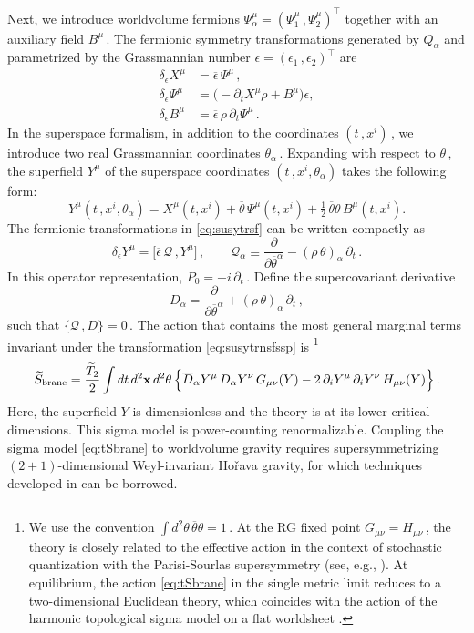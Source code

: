 \documentclass[11pt]{article}
\newcommand{\be}{\begin{equation}}
\newcommand{\ee}{\end{equation}}
\newcommand{\CQ}{\mathcal{Q}}
\newcommand{\p}{\partial}
\renewcommand{\tilde}[1]{\widetilde{#1}}
\begin{document}
Next, we introduce worldvolume fermions $\Psi^\mu_\alpha = (\Psi^\mu_1\,, \Psi^\mu_2)^\intercal$ together with an auxiliary field $B^{\mu}$\,. The fermionic symmetry transformations generated by $Q_\alpha$ and parametrized by the Grassmannian number $\epsilon = (\epsilon_1\,, \epsilon_2)^\intercal$ are
%
\begin{subequations} \label{eq:susytrsf}
\begin{align}
	\delta_\epsilon X^\mu & = \overline{\epsilon} \, \Psi^\mu\,, \\[2pt]
	\delta_\epsilon \Psi^\mu & = \bigl( - \p_t X^\mu \rho + B^{\mu} \bigr) \epsilon, \\[2pt]
	\delta_\epsilon B^{\mu} & = \overline{\epsilon} \, \rho \, \p_t \Psi^\mu\,.
\end{align}
\end{subequations}
%
In the superspace formalism, in addition to the coordinates $(t\,, x^i)$\,, we introduce two real Grassmannian coordinates $\theta_\alpha$\,.  Expanding with respect to $\theta$\,, the superfield $Y^\mu$ of the superspace coordinates $(t\,, x^i, \theta_\alpha)$ takes the following form: 
%
\be
	Y^\mu (t\,, x^i, \theta_\alpha) = X^\mu (t, x^i) + \overline{\theta} \, \Psi^\mu (t, x^i) + \tfrac{1}{2} \, \overline{\theta} \theta \, B^\mu (t, x^i).
\ee
%
The fermionic transformations in \eqref{eq:susytrsf} can be written compactly as
%
\be \label{eq:susytrnsfssp}
	\delta_\epsilon Y^\mu = \bigl[ \overline{\epsilon} \, \CQ\,, Y^\mu \bigr]\,,
		\qquad
	\CQ_\alpha \equiv \frac{\p}{\p {\overline{\theta}}^\alpha} - (\rho \, \theta)_\alpha \, \p_t\,. 
\ee
%
In this operator representation, $P_0 = - i \, \p_t$\,. Define the supercovariant derivative 
%
\be \label{eq:Dalpha}
	D_\alpha = \frac{\p}{\p {\overline{\theta}}^\alpha} + ( \rho \, \theta )_\alpha \, \p_t\,,
\ee
%
such that $\{ \CQ\,, D\} = 0$\,. The action that contains the most general marginal terms invariant under the transformation \eqref{eq:susytrnsfssp} is \cite{ssl, as}\footnote{We use the convention $\int d^2 \theta \, \overline{\theta} \theta = 1$\,. At the RG fixed point $G_{\mu\nu} = H_{\mu\nu}$\,, the theory is closely related to the effective action in the context of stochastic quantization with the Parisi-Sourlas supersymmetry (see, e.g., \cite{ZinnJustin:1986eq}). At equilibrium, the action \eqref{eq:tSbrane} in the single metric limit reduces to a two-dimensional Euclidean theory, which coincides with the action of the harmonic topological sigma model on a flat worldsheet \cite{Horava:1993aq, Horava:1995ic}.}
%
\begin{align} \label{eq:tSbrane}
	\tilde{S}_\text{brane} = \frac{\tilde{T}_2}{2} \int dt \, d^2 \mathbf{x} \, d^2 \theta \, \Bigl\{ \overline{D}_\alpha Y^\mu \, D_\alpha Y^\nu \, G_{\mu\nu} (Y) - 2 \, \p_i Y^\mu \, \p_i Y^\nu \, H_{\mu\nu} (Y) \Bigr\}\,. 
\end{align}
%
Here, the superfield $Y$ is dimensionless and the theory is at its lower critical dimensions. This sigma model is power-counting renormalizable. Coupling the sigma model \eqref{eq:tSbrane} to worldvolume gravity requires supersymmetrizing $(2+1)$-dimensional Weyl-invariant Ho\v{r}ava gravity, for which techniques developed in \cite{Frenkel:2020djn, Frenkel:2020ixs, Frenkel:2020dic} can be borrowed.
\end{document}
